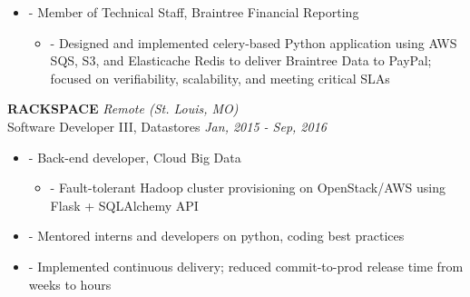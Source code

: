 \documentclass[a4paper,11pt]{article}
\newenvironment{pitemize}{
\begin{itemize}
\setlength{\itemsep}{.01in}
\setlength{\parskip}{.01in}
}
{\end{itemize}}
\begin{document}
\begin{pitemize}
\begin{pitemize}
\begin{pitemize}
            \item[-]Semi-automated table backfill process from PostgreSQL to S3
            \item[-]Validation process to compare Data Lake to source PostgreSQL databases
        \end{pitemize}
    \item[-]Regularly produced tech talks for team and Data Lake users
    \item[-]Proposed, designed, and built Google API Proxy for PayPal to provide auditing and governance controls; used golang and custom protobuf compiler plugin to programmatically generate APIs instead of previous approach re-implementing using OpenAPI, resulting in vast decrease in development time
    \end{pitemize}
    \item[-]Member of Technical Staff, Braintree Financial Reporting
    \begin{pitemize}
        \item[-]Designed and implemented celery-based Python application using AWS SQS, S3, and Elasticache Redis to deliver Braintree Data to PayPal; focused on verifiability, scalability, and meeting critical SLAs
    \end{pitemize}
\end{pitemize}

\vspace{0.2in}
\textbf{RACKSPACE} \hfill \textit{Remote (St. Louis, MO)} \\
Software Developer III, Datastores \hfill \textit{Jan, 2015 - Sep, 2016}
\begin{pitemize}
    \item[-]Back-end developer, Cloud Big Data
    \begin{pitemize}
        \item[-]Fault-tolerant Hadoop cluster provisioning on OpenStack/AWS using Flask + SQLAlchemy API
    \end{pitemize}
\item[-]Mentored interns and developers on python, coding best practices
\item[-]Implemented continuous delivery; reduced commit-to-prod release time from weeks to hours
\end{pitemize}
\end{document}
